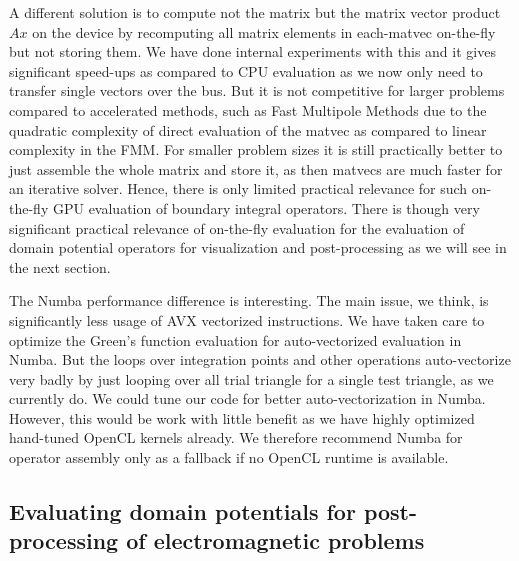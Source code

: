 A different solution is to compute not the matrix but the matrix vector product $Ax$ on the device by recomputing all matrix elements in each-matvec on-the-fly but not storing them. We have done internal experiments with this and it gives significant speed-ups as compared to CPU evaluation as we now only need to transfer single vectors over the bus. But it is not competitive for larger problems compared to accelerated methods, such as Fast Multipole Methods due to the quadratic complexity of direct evaluation of the matvec as compared to linear complexity in the FMM. For smaller problem sizes it is still practically better to just assemble the whole matrix and store it, as then matvecs are much faster for an iterative solver. Hence, there is only limited practical relevance for such on-the-fly GPU evaluation of boundary integral operators. There is though very significant practical relevance of on-the-fly evaluation for the evaluation of domain potential operators for visualization and post-processing as we will see in the next section.

The Numba performance difference is interesting. The main issue, we think, is significantly less usage of AVX vectorized instructions. We have taken care to optimize the Green's function evaluation for auto-vectorized evaluation in Numba. But the loops over integration points and other operations auto-vectorize very badly by just looping over all trial triangle for a single test triangle, as we currently do. We could tune our code for better auto-vectorization in Numba. However, this would be work with little benefit as we have highly optimized hand-tuned OpenCL kernels already. We therefore recommend Numba for operator assembly only as a fallback if no OpenCL runtime is available.

\subsection{Evaluating domain potentials for post-processing of electromagnetic problems}

